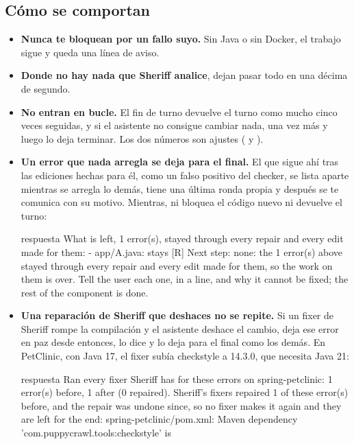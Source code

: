 \documentclass[11pt,a4paper]{article}
\begin{document}
\subsection{Cómo se comportan}

\begin{itemize}
  \item \textbf{Nunca te bloquean por un fallo suyo.} Sin Java o sin Docker, el
        trabajo sigue y queda una línea de aviso.
  \item \textbf{Donde no hay nada que Sheriff analice}, dejan pasar todo en
        una décima de segundo.
  \item \textbf{No entran en bucle.} El fin de turno devuelve el turno como mucho
        cinco veces seguidas, y si el asistente no consigue cambiar nada, una vez
        más y luego lo deja terminar. Los dos números son ajustes
        ( y ).
  \item \textbf{Un error que nada arregla se deja para el final.} El que sigue
        ahí tras las ediciones hechas para él, como un falso positivo del
        checker, se lista aparte mientras se arregla lo demás, tiene una
        última ronda propia y después se te comunica con su motivo. Mientras,
        ni bloquea el código nuevo ni devuelve el turno:
\begin{command}[basicstyle=\ttfamily\footnotesize]{respuesta}
What is left, 1 error(s), stayed through every repair and every edit made
for them:
  - app/A.java: stays  [R]
Next step: none: the 1 error(s) above stayed through every repair and every
edit made for them, so the work on them is over. Tell the user each one, in a
line, and why it cannot be fixed; the rest of the component is done.
\end{command}
  \item \textbf{Una reparación de Sheriff que deshaces no se repite.} Si un
        fixer de Sheriff rompe la compilación y el asistente deshace el cambio,
         deja ese error en paz desde entonces, lo dice y lo
        deja para el final como los demás. En PetClinic, con Java 17, el fixer
        subía checkstyle a 14.3.0, que necesita Java 21:
\begin{command}[basicstyle=\ttfamily\footnotesize]{respuesta}
Ran every fixer Sheriff has for these errors on spring-petclinic: 1 error(s)
before, 1 after (0 repaired).
Sheriff's fixers repaired 1 of these error(s) before, and the repair was undone
since, so no fixer makes it again and they are left for the end:
spring-petclinic/pom.xml: Maven dependency 'com.puppycrawl.tools:checkstyle' is

\end{command}
\end{itemize}
\end{document}
